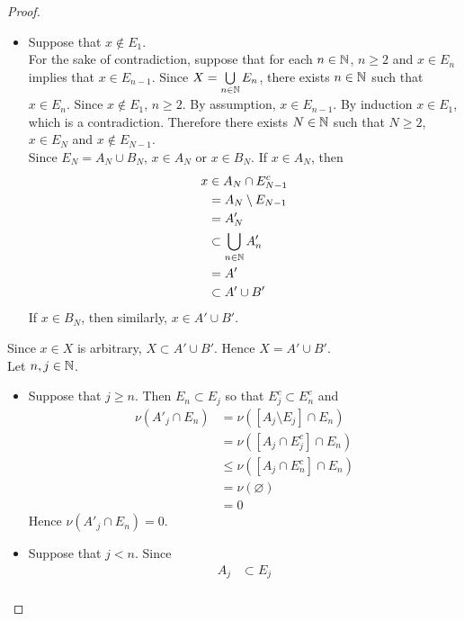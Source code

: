 \documentclass{book}
\begin{document}
\begin{proof}
\begin{itemize}
\begin{align*}
				& = A_1 \cap B_1 \\
				& = A'_1 \cap B'_1 \\
				& \subset \bigg[ \bigcup_{n \in \N} A'_n \bigg] \cup \bigg[ \bigcup_{n \in \N} B'_n \bigg] \\
				& = A' \cup B'
			\end{align*} 
			\item Suppose that $x \not \in E_1$. \\
			For the sake of contradiction, suppose that for each $n \in \mathbb{N}$, $n \geq 2$ and $x \in E_n$ implies that $x \in E_{n-1}$. Since $X = \bigcup\limits_{n \in \mathbb{N}} E_n$, there exists $n \in \mathbb{N}$ such that $x \in E_n$. Since $x \not \in E_1$, $n \geq 2$. By assumption, $x \in E_{n-1}$. By induction $x \in E_1$, which is a contradiction. Therefore there exists $N \in \mathbb{N}$ such that $N \geq 2$, $x \in E_N$ and $x \not \in E_{N-1}$. \\
			Since $E_N = A_N \cup B_N$, $x \in A_N$ or $x \in B_N$. If $x \in A_N$, then 
			\begin{align*}
				x
				& \in A_N \cap E_{N-1}^c \\
				& = A_N \setminus E_{N-1} \\
				& = A'_N \\
				& \subset \bigcup_{n \in \mathbb{N}} A'_n \\
				& = A' \\
				& \subset A' \cup B'
			\end{align*}
			If $x \in B_N$, then similarly, $x \in A' \cup B'$. 
		\end{itemize}
		Since $x \in X$ is arbitrary, $X \subset A' \cup B'$. Hence $X = A' \cup B'$. \\
		Let $n, j \in \mathbb{N}$. 
		\begin{itemize}
			\item Suppose that $j \geq n$. Then $E_n \subset E_j$ so that $E_j^c \subset E_n^c$ and
			\begin{align*}
				\nu(A'_j \cap E_n)
				& = \nu([A_j \setminus E_j] \cap E_n) \\
				& = \nu([A_j \cap E_j^c] \cap E_n) \\
				& \leq \nu([A_j \cap E_n^c] \cap E_n) \\ 
				& =  \nu(\varnothing) \\
				& = 0 
			\end{align*}
			Hence $\nu(A'_j \cap E_n) = 0$. 
			\item Suppose that $j < n$. Since 
			\begin{align*}
				A_j 
				& \subset E_j \\

\end{align*}
\end{itemize}
\end{proof}
\end{document}
